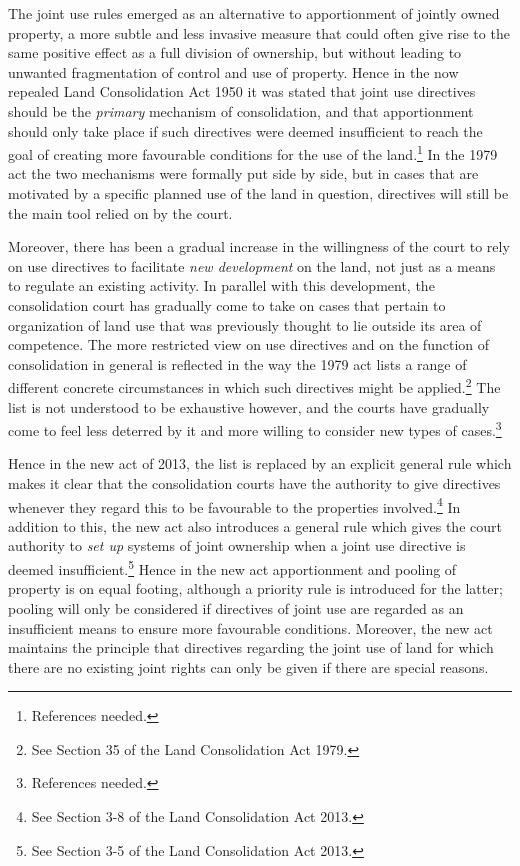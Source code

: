 The joint use rules emerged as an alternative to apportionment of jointly owned property, a more subtle and less invasive measure that could often give rise to the same positive effect as a full division of ownership, but without leading to unwanted fragmentation of control and use of property. Hence in the now repealed Land Consolidation Act 1950 it was stated that joint use directives should be the \emph{primary} mechanism of consolidation, and that apportionment should only take place if such directives were deemed insufficient to reach the goal of creating more favourable conditions for the use of the land.\footnote{References needed.} In the 1979 act the two mechanisms were formally put side by side, but in cases that are motivated by a specific planned use of the land in question, directives will still be the main tool relied on by the court.

Moreover, there has been a gradual increase in the willingness of the court to rely on use directives to facilitate \emph{new development} on the land, not just as a means to regulate an existing activity. In parallel with this development, the consolidation court has gradually come to take on cases that pertain to organization of land use that was previously thought to lie outside its area of competence. The more restricted view on use directives and on the function of consolidation in general is reflected in the way the 1979 act lists a range of different concrete circumstances in which such directives might be applied.\footnote{See Section 35 of the Land Consolidation Act 1979.} The list is not understood to be exhaustive however, and the courts have gradually come to feel less deterred by it and more willing to consider new types of cases.\footnote{References needed.}

Hence in the new act of 2013, the list is replaced by an explicit general rule which makes it clear that the  consolidation courts have the authority to give directives whenever they regard this to be favourable to the properties involved.\footnote{See Section 3-8 of the Land Consolidation Act 2013.} In addition to this, the new act also introduces a general rule which gives the court authority to \emph{set up} systems of joint ownership when a joint use directive is deemed insufficient.\footnote{See Section 3-5 of the Land Consolidation Act 2013.} Hence in the new act apportionment and pooling of property is on equal footing, although a priority rule is introduced for the latter; pooling will only be considered if directives of joint use are regarded as an insufficient means to ensure more favourable conditions. Moreover, the new act maintains the principle that directives regarding the joint use of land for which there are no existing joint rights can only be given if there are special reasons.

